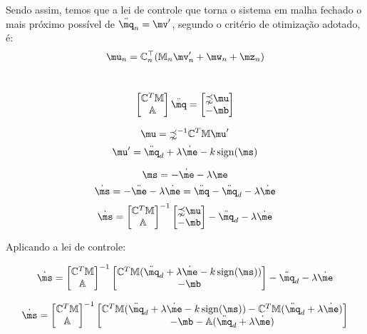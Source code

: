 Sendo assim, temos que a lei de controle que torna o sistema em malha fechado o mais pr\'oximo poss\'ivel de $\ddot{\mq}_n = \mv'$, segundo o crit\'erio de otimiza\c{c}\~ao adotado, \'e:
\begin{equation} \label{eq:ControlLawFinal}
\mu_n = \mC_n^\top ( \mM_n \mv'_n + \mw_n + \mz_n )
\end{equation}

\newpage

\\

$$
\begin{bmatrix}
\mC^T \mM \\
\mA
\end{bmatrix}
\ddot{\mq}
=
\begin{bmatrix}
\mathbb{\zeta} \mu \\
-\mb
\end{bmatrix}
$$



$$ \mu = \mathbb{\zeta}^{-1} \mC^T \mM \mu' $$
$$ \mu' = \ddot{\mq}_d + \lambda \dot{\me} - k  \sign (\ms) $$

$$ \ms = - \dot{\me} - \lambda \me $$
$$ \dot{\ms} = - \ddot{\me} - \lambda \dot{\me} = \ddot{\mq} - \ddot{\mq}_d  - \lambda \dot{\me} $$
$$ \dot{\ms} =  \begin{bmatrix}
\mC^T \mM \\
\mA
\end{bmatrix}^{-1}
\begin{bmatrix}
\mathbb{\zeta} \mu \\
-\mb
\end{bmatrix}
 - \ddot{\mq}_d  - \lambda \dot{\me} $$
 
Aplicando a lei de controle:

$$ \dot{\ms} =  \begin{bmatrix}
\mC^T \mM \\
\mA
\end{bmatrix}^{-1}
\begin{bmatrix}
 \mC^T \mM (\ddot{\mq}_d + \lambda \dot{\me} - k  \sign (\ms)) \\
-\mb
\end{bmatrix}
 - \ddot{\mq}_d  - \lambda \dot{\me} $$
 
 $$ \dot{\ms} =  \begin{bmatrix}
\mC^T \mM \\
\mA
\end{bmatrix}^{-1}
\begin{bmatrix}
 \mC^T \mM (\ddot{\mq}_d + \lambda \dot{\me} - k  \sign (\ms)) -  \mC^T \mM(\ddot{\mq}_d  + \lambda \dot{\me}) \\
-\mb - \mA(\ddot{\mq}_d  + \lambda \dot{\me})
\end{bmatrix} $$

